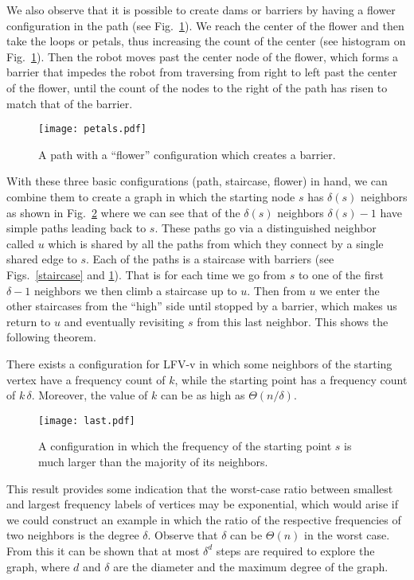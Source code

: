 We also observe that it is possible to create dams or barriers by having a
flower configuration  in the path (see Fig.~\ref{petals}). We reach
the center of the flower and then take the loops or petals, thus increasing the
count of the center (see histogram on Fig.~\ref{petals}).
Then the robot moves past the center node of the flower, which forms
a barrier that impedes the robot from traversing from right to left past the
center of the flower, until the count of the nodes to the right of the path has
risen to match that of the barrier.
\begin{figure}\centering
 \texttt{[image: petals.pdf]}
\caption{A path with a ``flower'' configuration which creates a barrier.} \label{petals}
 \end{figure}
With these three basic configurations (path, staircase, flower) in hand, we can combine them to create a
graph in which the starting node $s$ has $\delta(s)$ neighbors as shown in Fig.~\ref{freq}
where we can see that of the $\delta(s)$ neighbors $\delta(s)-1$ have simple paths
leading back to $s$. These paths go via a distinguished neighbor called $u$
which is shared by all the paths from which they connect by a single shared edge to $s$.
Each of the paths is a staircase with barriers (see Figs.~\ref{staircase} and \ref{petals}).
That is for each time we go from $s$ to one of the first $\delta-1$ neighbors
we then climb a staircase up to $u$. Then from $u$ we enter the other
staircases from the ``high'' side until stopped
by a barrier, which makes us return to $u$ and eventually
revisiting $s$ from this last neighbor. This shows the following theorem.

\begin{theorem}
\label{th:ratio}
There exists a configuration for LFV-v in which some neighbors of the starting
vertex have a frequency count of $k$, while the starting point has
a frequency count of $k\,\delta$. Moreover, the value of $k$ can be as high
as $\Theta(n/\delta)$.
\end{theorem}
\begin{figure}\centering
 \texttt{[image: last.pdf]}
\caption{A configuration in which the frequency of the starting point $s$ is
much larger than the majority of its neighbors.  } \label{freq}
 \end{figure}
This result provides some indication that the worst-case ratio between
smallest and largest frequency labels of vertices may be exponential,
which would arise if we could construct an example in which the ratio of the
respective frequencies of two neighbors is the degree $\delta$. Observe that $\delta$
can be $\Theta(n)$ in the worst case.
From this it can be shown that at most $\delta^d$ steps are required to explore the graph,
where $d$ and $\delta$ are the diameter and the maximum degree of the graph.

